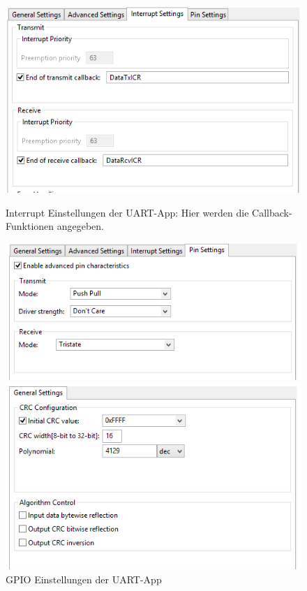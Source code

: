 \begin{figure}[!h]
  \begin{minipage}{0.4\textwidth}
    \centering
    \includegraphics[width=\textwidth]{UARTinterSet}
    \caption{Interrupt Einstellungen der UART-App: Hier werden die Callback-Funktionen angegeben.}
  \end{minipage}
  \begin{minipage}{0.4\textwidth}
    \centering
    \includegraphics[width=\textwidth]{UARTpinSet}
    \caption{GPIO Einstellungen der UART-App}
  \end{minipage}
  \begin{minipage}{0.4\textwidth}
    \centering
    \includegraphics[width=\textwidth]{CRCgeneralSet}

\end{minipage}
\end{figure}
